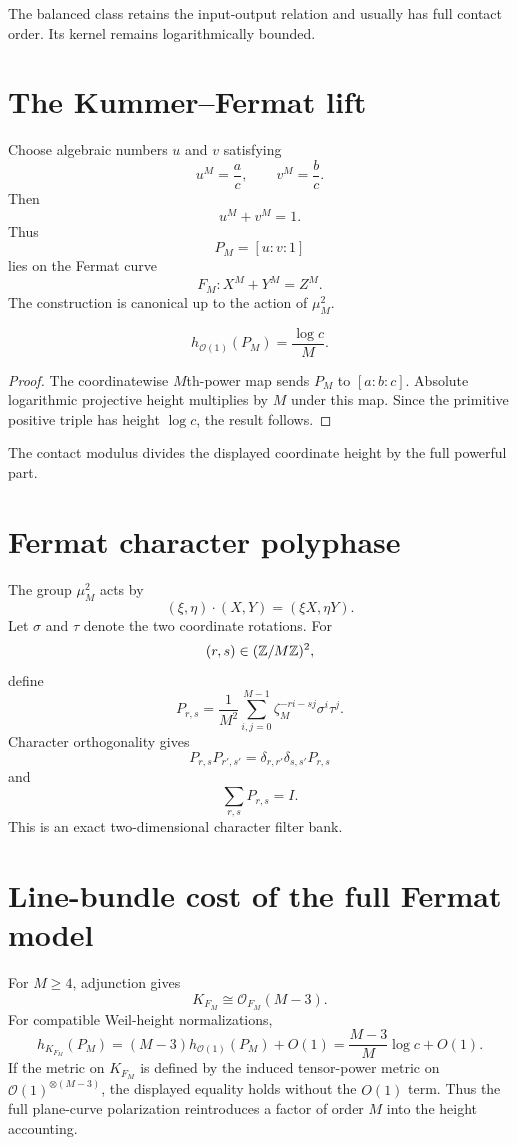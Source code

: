 The balanced class retains the input-output relation and usually has full contact order. Its kernel remains logarithmically bounded.

\section{The Kummer--Fermat lift}
Choose algebraic numbers $u$ and $v$ satisfying
\[
 u^M=\frac ac,
 \qquad
 v^M=\frac bc.
\]
Then
\[
 \boxed{u^M+v^M=1.}
\]
Thus
\[
 P_M=[u:v:1]
\]
lies on the Fermat curve
\[
 F_M:X^M+Y^M=Z^M.
\]
The construction is canonical up to the action of $\mu_M^2$.

\begin{theorem}
\[
 \boxed{
 h_{\mathcal O(1)}(P_M)=\frac{\log c}{M}.
 }
\]
\end{theorem}

\begin{proof}
The coordinatewise $M$th-power map sends $P_M$ to $[a:b:c]$. Absolute logarithmic projective height multiplies by $M$ under this map. Since the primitive positive triple has height $\log c$, the result follows.
\end{proof}

The contact modulus divides the displayed coordinate height by the full powerful part.

\section{Fermat character polyphase}
The group $\mu_M^2$ acts by
\[
 (\xi,\eta)\cdot(X,Y)=(\xi X,\eta Y).
\]
Let $\sigma$ and $\tau$ denote the two coordinate rotations. For
\[
 (r,s)\in(\mathbb Z/M\mathbb Z)^2,
\]
define
\[
 P_{r,s}
 =
 \frac1{M^2}
 \sum_{i,j=0}^{M-1}
 \zeta_M^{-ri-sj}
 \sigma^i\tau^j.
\]
Character orthogonality gives
\[
 P_{r,s}P_{r',s'}
 =
 \delta_{r,r'}\delta_{s,s'}P_{r,s}
\]
and
\[
 \boxed{
 \sum_{r,s}P_{r,s}=I.
 }
\]
This is an exact two-dimensional character filter bank.

\section{Line-bundle cost of the full Fermat model}
For $M\ge4$, adjunction gives
\[
 K_{F_M}\cong\mathcal O_{F_M}(M-3).
\]
For compatible Weil-height normalizations,
\[
 h_{K_{F_M}}(P_M)
 =
 (M-3)h_{\mathcal O(1)}(P_M)+O(1)
 =
 \frac{M-3}{M}\log c+O(1).
\]
If the metric on $K_{F_M}$ is defined by the induced tensor-power metric on $\mathcal O(1)^{\otimes(M-3)}$, the displayed equality holds without the $O(1)$ term. Thus the full plane-curve polarization reintroduces a factor of order $M$ into the height accounting.


